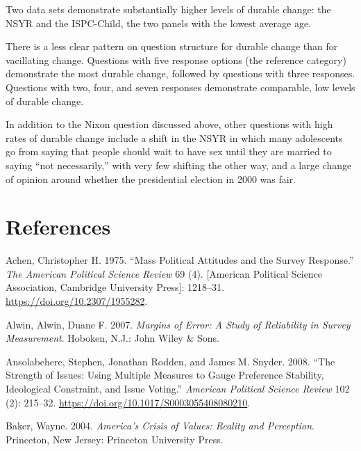 \documentclass[12pt,]{article}
\begin{document}
Two data sets demonstrate substantially higher levels of durable change: the NSYR and the ISPC-Child, the two panels with the lowest average age.

There is a less clear pattern on question structure for durable change than for vacillating change. Questions with five response options (the reference category) demonstrate the most durable change, followed by questions with three responses. Questions with two, four, and seven responses demonstrate comparable, low levels of durable change.

In addition to the Nixon question discussed above, other questions with high rates of durable change include a shift in the NSYR in which many adolescents go from saying that people should wait to have sex until they are married to saying ``not necessarily,'' with very few shifting the other way, and a large change of opinion around whether the presidential election in 2000 was fair.

\newpage

\hypertarget{references}{%
\section{References}\label{references}}

\singlespace
\setlength{\parindent}{-0.2in}
\setlength{\leftskip}{0.2in}
\setlength{\parskip}{0pt}

\noindent

\hypertarget{refs}{}
\leavevmode\hypertarget{ref-achen1975}{}%
Achen, Christopher H. 1975. ``Mass Political Attitudes and the Survey Response.'' \emph{The American Political Science Review} 69 (4). {[}American Political Science Association, Cambridge University Press{]}: 1218--31. \url{https://doi.org/10.2307/1955282}.

\leavevmode\hypertarget{ref-alwin2007}{}%
Alwin, Alwin, Duane F. 2007. \emph{Margins of Error: A Study of Reliability in Survey Measurement}. Hoboken, N.J.: John Wiley \& Sons.

\leavevmode\hypertarget{ref-ansolabehere2008}{}%
Ansolabehere, Stephen, Jonathan Rodden, and James M. Snyder. 2008. ``The Strength of Issues: Using Multiple Measures to Gauge Preference Stability, Ideological Constraint, and Issue Voting.'' \emph{American Political Science Review} 102 (2): 215--32. \url{https://doi.org/10.1017/S0003055408080210}.

\leavevmode\hypertarget{ref-baker2004}{}%
Baker, Wayne. 2004. \emph{America's Crisis of Values: Reality and Perception}. Princeton, New Jersey: Princeton University Press.
\end{document}
